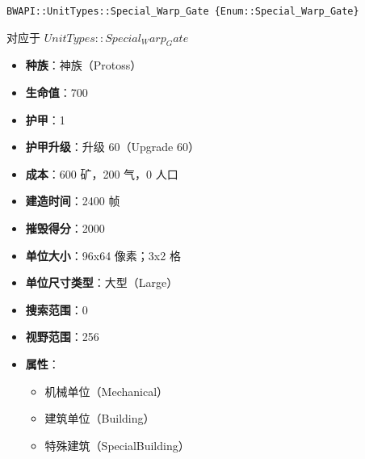 \begin{tcolorbox}[colback=white, colframe=black!60!white, title=Special\_Warp\_Gate(), arc=0mm]
    \begin{verbatim}
BWAPI::UnitTypes::Special_Warp_Gate {Enum::Special_Warp_Gate}
    \end{verbatim}
    对应于  $UnitTypes::Special_Warp_Gate$ 
    \begin{itemize}
        \item \textbf{种族}：神族（Protoss）
        \item \textbf{生命值}：700
        \item \textbf{护甲}：1
        \item \textbf{护甲升级}：升级 60（Upgrade 60）
        \item \textbf{成本}：600 矿，200 气，0 人口
        \item \textbf{建造时间}：2400 帧
        \item \textbf{摧毁得分}：2000
        \item \textbf{单位大小}：96x64 像素；3x2 格
        \item \textbf{单位尺寸类型}：大型（Large）
        \item \textbf{搜索范围}：0
        \item \textbf{视野范围}：256
        \item \textbf{属性}：
            \begin{itemize}
                \item 机械单位（Mechanical）
                \item 建筑单位（Building）
                \item 特殊建筑（SpecialBuilding）
            \end{itemize}
    \end{itemize}
\end{tcolorbox}

